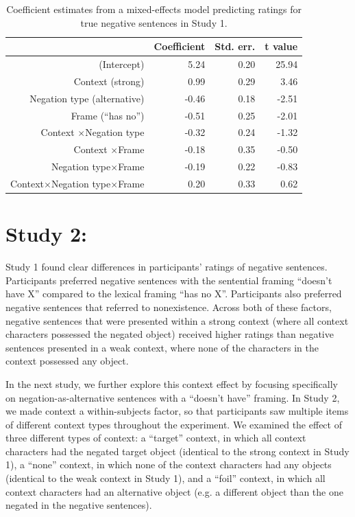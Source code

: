 \documentclass[10pt,letterpaper]{article}
\begin{document}
\begin{table}[t]
\caption{\label{tab:s1} Coefficient estimates from a mixed-effects model predicting ratings for true negative sentences in Study 1.}
\begin{center}
\small\addtolength{\tabcolsep}{-5pt}
\begin{tabular}{rrrr}
  \hline
 & Coefficient & Std. err. & t value \\ 
  \hline
(Intercept) & 5.24 & 0.20 & 25.94 \\ 
  Context (strong) & 0.99 & 0.29 & 3.46  \\ 
  Negation type (alternative) & -0.46 & 0.18 & -2.51 \\
  Frame (``has no'') & -0.51 & 0.25 & -2.01 \\ 
  Context $\times$Negation type & -0.32 & 0.24 & -1.32 \\
  Context $\times$Frame & -0.18 & 0.35 & -0.50 \\
  Negation type$\times$Frame & -0.19 & 0.22 & -0.83 \\
  Context$\times$Negation type$\times$Frame & 0.20 & 0.33 & 0.62 \\
   \hline
\end{tabular}
\vspace{-1.5cm}
\end{center}
\end{table}

\section{Study 2:}

Study 1 found clear differences in participants' ratings of negative sentences.  Participants preferred negative sentences with the sentential framing ``doesn't have X'' compared to the lexical framing ``has no X''.  Participants also preferred negative sentences that referred to nonexistence.  Across both of these factors, negative sentences that were presented within a strong context (where all context characters possessed the negated object) received higher ratings than negative sentences presented in a weak context, where none of the characters in the context possessed any object.

In the next study, we further explore this context effect by focusing specifically on negation-as-alternative sentences with a ``doesn't have'' framing.  In Study 2, we made context a within-subjects factor, so that participants saw multiple items of different context types throughout the experiment.  We examined the effect of three different types of context: a ``target'' context, in which all context characters had the negated target object (identical to the strong context in Study 1), a ``none'' context, in which none of the context characters had any objects (identical to the weak context in Study 1), and a ``foil'' context, in which all context characters had an alternative object (e.g. a different object than the one negated in the negative sentences). 
\end{document}
